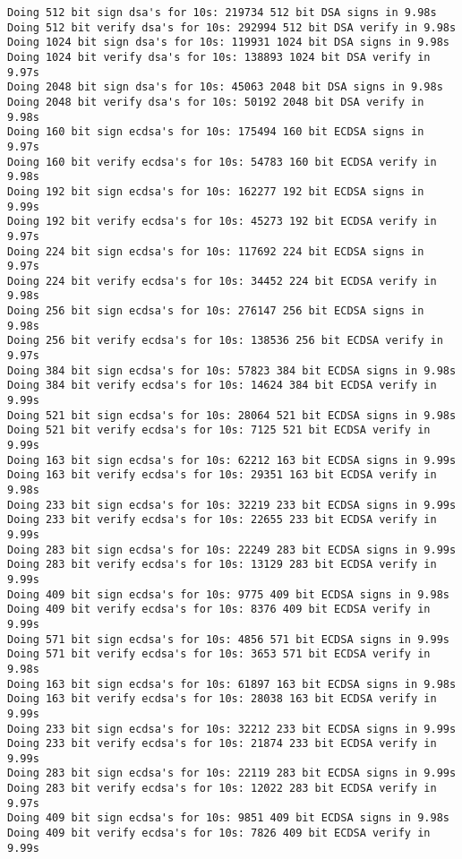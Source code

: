 \documentclass[%
 aip,
 jmp,%
 amsmath,amssymb,
 reprint,%
]{revtex4-1}
\begin{document}
\begin{verbatim}
Doing 512 bit sign dsa's for 10s: 219734 512 bit DSA signs in 9.98s
Doing 512 bit verify dsa's for 10s: 292994 512 bit DSA verify in 9.98s
Doing 1024 bit sign dsa's for 10s: 119931 1024 bit DSA signs in 9.98s
Doing 1024 bit verify dsa's for 10s: 138893 1024 bit DSA verify in 9.97s
Doing 2048 bit sign dsa's for 10s: 45063 2048 bit DSA signs in 9.98s
Doing 2048 bit verify dsa's for 10s: 50192 2048 bit DSA verify in 9.98s
Doing 160 bit sign ecdsa's for 10s: 175494 160 bit ECDSA signs in 9.97s 
Doing 160 bit verify ecdsa's for 10s: 54783 160 bit ECDSA verify in 9.98s
Doing 192 bit sign ecdsa's for 10s: 162277 192 bit ECDSA signs in 9.99s 
Doing 192 bit verify ecdsa's for 10s: 45273 192 bit ECDSA verify in 9.97s
Doing 224 bit sign ecdsa's for 10s: 117692 224 bit ECDSA signs in 9.97s 
Doing 224 bit verify ecdsa's for 10s: 34452 224 bit ECDSA verify in 9.98s
Doing 256 bit sign ecdsa's for 10s: 276147 256 bit ECDSA signs in 9.98s 
Doing 256 bit verify ecdsa's for 10s: 138536 256 bit ECDSA verify in 9.97s
Doing 384 bit sign ecdsa's for 10s: 57823 384 bit ECDSA signs in 9.98s 
Doing 384 bit verify ecdsa's for 10s: 14624 384 bit ECDSA verify in 9.99s
Doing 521 bit sign ecdsa's for 10s: 28064 521 bit ECDSA signs in 9.98s 
Doing 521 bit verify ecdsa's for 10s: 7125 521 bit ECDSA verify in 9.99s
Doing 163 bit sign ecdsa's for 10s: 62212 163 bit ECDSA signs in 9.99s 
Doing 163 bit verify ecdsa's for 10s: 29351 163 bit ECDSA verify in 9.98s
Doing 233 bit sign ecdsa's for 10s: 32219 233 bit ECDSA signs in 9.99s 
Doing 233 bit verify ecdsa's for 10s: 22655 233 bit ECDSA verify in 9.99s
Doing 283 bit sign ecdsa's for 10s: 22249 283 bit ECDSA signs in 9.99s 
Doing 283 bit verify ecdsa's for 10s: 13129 283 bit ECDSA verify in 9.99s
Doing 409 bit sign ecdsa's for 10s: 9775 409 bit ECDSA signs in 9.98s 
Doing 409 bit verify ecdsa's for 10s: 8376 409 bit ECDSA verify in 9.99s
Doing 571 bit sign ecdsa's for 10s: 4856 571 bit ECDSA signs in 9.99s 
Doing 571 bit verify ecdsa's for 10s: 3653 571 bit ECDSA verify in 9.98s
Doing 163 bit sign ecdsa's for 10s: 61897 163 bit ECDSA signs in 9.98s 
Doing 163 bit verify ecdsa's for 10s: 28038 163 bit ECDSA verify in 9.99s
Doing 233 bit sign ecdsa's for 10s: 32212 233 bit ECDSA signs in 9.99s 
Doing 233 bit verify ecdsa's for 10s: 21874 233 bit ECDSA verify in 9.99s
Doing 283 bit sign ecdsa's for 10s: 22119 283 bit ECDSA signs in 9.99s 
Doing 283 bit verify ecdsa's for 10s: 12022 283 bit ECDSA verify in 9.97s
Doing 409 bit sign ecdsa's for 10s: 9851 409 bit ECDSA signs in 9.98s 
Doing 409 bit verify ecdsa's for 10s: 7826 409 bit ECDSA verify in 9.99s

\end{verbatim}
\end{document}
